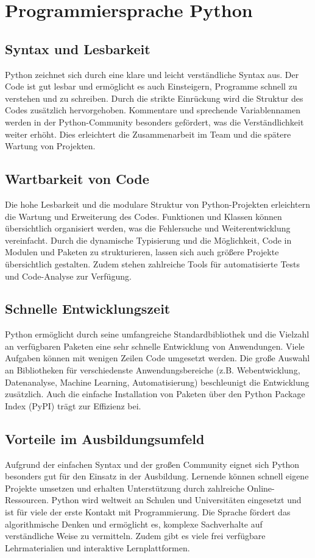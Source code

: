 \documentclass[12pt,a4paper]{report}
\begin{document}
\section{Programmiersprache Python}
    \subsection{Syntax und Lesbarkeit}
        Python zeichnet sich durch eine klare und leicht verständliche Syntax aus. Der Code ist gut lesbar und ermöglicht es auch Einsteigern, Programme schnell zu verstehen und zu schreiben. Durch die strikte Einrückung wird die Struktur des Codes zusätzlich hervorgehoben. Kommentare und sprechende Variablennamen werden in der Python-Community besonders gefördert, was die Verständlichkeit weiter erhöht. Dies erleichtert die Zusammenarbeit im Team und die spätere Wartung von Projekten.

    \subsection{Wartbarkeit von Code}
        Die hohe Lesbarkeit und die modulare Struktur von Python-Projekten erleichtern die Wartung und Erweiterung des Codes. Funktionen und Klassen können übersichtlich organisiert werden, was die Fehlersuche und Weiterentwicklung vereinfacht. Durch die dynamische Typisierung und die Möglichkeit, Code in Modulen und Paketen zu strukturieren, lassen sich auch größere Projekte übersichtlich gestalten. Zudem stehen zahlreiche Tools für automatisierte Tests und Code-Analyse zur Verfügung.

    \subsection{Schnelle Entwicklungszeit}
        Python ermöglicht durch seine umfangreiche Standardbibliothek und die Vielzahl an verfügbaren Paketen eine sehr schnelle Entwicklung von Anwendungen. Viele Aufgaben können mit wenigen Zeilen Code umgesetzt werden. Die große Auswahl an Bibliotheken für verschiedenste Anwendungsbereiche (z.B. Webentwicklung, Datenanalyse, Machine Learning, Automatisierung) beschleunigt die Entwicklung zusätzlich. Auch die einfache Installation von Paketen über den Python Package Index (PyPI) trägt zur Effizienz bei.

    \subsection{Vorteile im Ausbildungsumfeld}
        Aufgrund der einfachen Syntax und der großen Community eignet sich Python besonders gut für den Einsatz in der Ausbildung. Lernende können schnell eigene Projekte umsetzen und erhalten Unterstützung durch zahlreiche Online-Ressourcen. Python wird weltweit an Schulen und Universitäten eingesetzt und ist für viele der erste Kontakt mit Programmierung. Die Sprache fördert das algorithmische Denken und ermöglicht es, komplexe Sachverhalte auf verständliche Weise zu vermitteln. Zudem gibt es viele frei verfügbare Lehrmaterialien und interaktive Lernplattformen.
\end{document}
